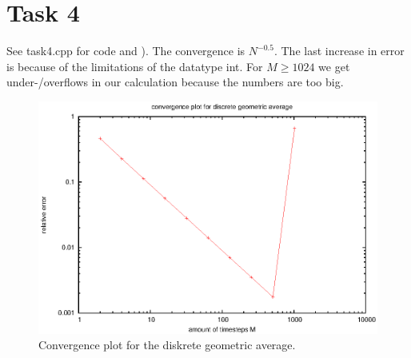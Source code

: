 \documentclass[]{article}
\begin{document}
\section*{Task 4} See task4.cpp for code and ). The convergence
is $N^{-0.5}$. The last increase in error is because of the limitations of
the datatype int. For $M\ge 1024$ we get under-/overflows in our calculation
because the numbers are too big.
\begin{figure}[!ht]
\includegraphics{task4.eps}
\caption{Convergence plot for the diskrete geometric average.}
\label{fig:Task4}
\end{figure}
\clearpage
\end{document}
